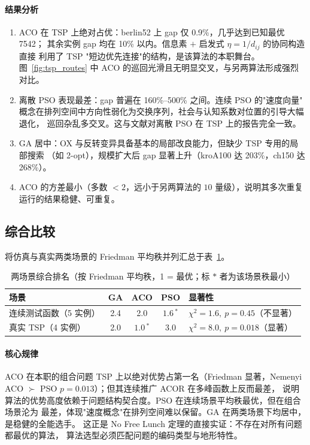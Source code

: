\documentclass[12pt,a4paper,fontset=windows]{ctexart}
\begin{document}
\paragraph{结果分析}

\begin{enumerate}
  \item ACO 在 TSP 上绝对占优：berlin52 上 gap 仅 0.9\%，几乎达到已知最优 7542；
        其余实例 gap 均在 10\% 以内。信息素 $+$ 启发式 $\eta=1/d_{ij}$ 的协同构造直接
        利用了 TSP "短边优先连接"的结构，是该算法的本职舞台。图~\ref{fig:tsp_routes}
        中 ACO 的巡回光滑且无明显交叉，与另两算法形成强烈对比。
  \item 离散 PSO 表现最差：gap 普遍在 160\%--500\% 之间。连续 PSO 的"速度向量"
        概念在排列空间中方向性弱化为交换序列，社会与认知系数对位置的引导大幅退化，
        巡回杂乱多交叉。这与文献对离散 PSO 在 TSP 上的报告完全一致。
  \item GA 居中：OX 与反转变异具备基本的局部改良能力，但缺少 TSP 专用的局部搜索
        （如 2-opt），规模扩大后 gap 显著上升（kroA100 达 203\%，ch150 达 268\%）。
  \item ACO 的方差最小（多数 $<2$，远小于另两算法的 $10$ 量级），说明其多次重复
        运行的结果稳健、可重复。
\end{enumerate}

\subsection{综合比较}

将仿真与真实两类场景的 Friedman 平均秩并列汇总于表~\ref{tab:overall}。

\begin{table}[H]
  \centering
  \caption{两场景综合排名（按 Friedman 平均秩，1 = 最优；标 $\ast$ 者为该场景秩最小）}
  \label{tab:overall}
  \small
  \begin{tabular}{lcccl}
    \toprule
    场景 & GA & ACO & PSO & 显著性 \\
    \midrule
    连续测试函数（5 实例） & 2.4 & 2.0 & $1.6\,^{\ast}$ & $\chi^2=1.6,\ p=0.45$（不显著） \\
    真实 TSP（4 实例）     & 2.0 & $1.0\,^{\ast}$ & 3.0 & $\chi^2=8.0,\ p=0.018$（显著） \\
    \bottomrule
  \end{tabular}
\end{table}

\paragraph{核心规律}
ACO 在本职的组合问题 TSP 上以绝对优势占第一名（Friedman 显著，Nemenyi
ACO $\succ$ PSO $p=0.013$）；但其连续推广 ACOR 在多峰函数上反而最差，
说明算法的优势高度依赖于问题结构契合度。PSO 在连续场景平均秩最优，但在组合场景沦为
最差，体现"速度概念"在排列空间难以保留。GA 在两类场景下均居中，是稳健的全能选手。
这正是 No Free Lunch 定理的直接实证：不存在对所有问题都最优的算法，
算法选型必须匹配问题的编码类型与地形特性。
\end{document}
